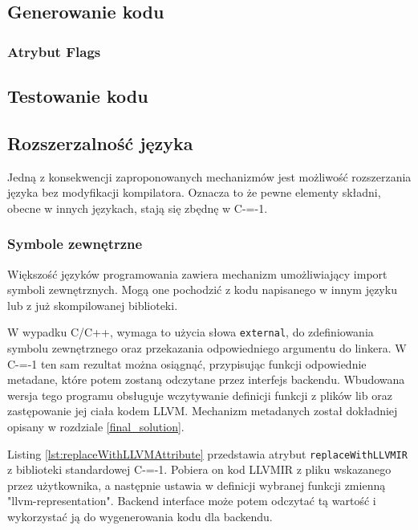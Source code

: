 \subsection{Generowanie kodu}

\subsubsection{Atrybut Flags}

\subsection{Testowanie kodu}

\subsection{Rozszerzalność języka}
\label{Language_extensibility}
Jedną z konsekwencji zaproponowanych mechanizmów jest możliwość rozszerzania języka bez modyfikacji kompilatora.
Oznacza to że pewne elementy składni, obecne w innych językach, stają się zbędnę w C-=-1.
\subsubsection{Symbole zewnętrzne}
Większość języków programowania zawiera mechanizm umożliwiający import symboli zewnętrznych.
Mogą one pochodzić z kodu napisanego w innym języku lub z już skompilowanej biblioteki.

W wypadku C/C++, wymaga to użycia słowa \lstinline{external}, do zdefiniowania symbolu zewnętrznego oraz przekazania odpowiedniego argumentu do linkera.
W C-=-1 ten sam rezultat można osiągnąć, przypisując funkcji odpowiednie metadane, które potem zostaną odczytane przez interfejs backendu.
Wbudowana wersja tego programu obsługuje wczytywanie definicji funkcji z plików lib oraz zastępowanie jej ciała kodem LLVM.
Mechanizm metadanych został dokładniej opisany w rozdziale \ref{final_solution}.

Listing \ref{lst:replaceWithLLVMAttribute} przedstawia atrybut \lstinline{replaceWithLLVMIR} z biblioteki standardowej C-=-1. 
Pobiera on kod LLVMIR z pliku wskazanego przez użytkownika, a następnie ustawia w definicji wybranej funkcji zmienną "llvm-representation".
Backend interface może potem odczytać tą wartość i wykorzystać ją do wygenerowania kodu dla backendu.



